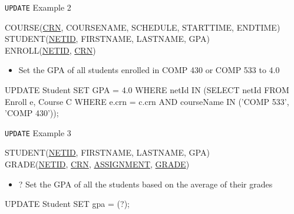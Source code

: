 \documentclass[aspectratio=169]{beamer}
\newenvironment{noindentitemize}
{ \begin{itemize}
 \setlength{\itemsep}{1.5ex}
  \setlength{\parsep}{0pt}   
  \setlength{\parskip}{0pt}
 \addtolength{\leftskip}{-2em}
 }
{ \end{itemize} }
\begin{document}
\begin{frame}[fragile]{\texttt{UPDATE} Example 2}

COURSE(\underline{CRN}, COURSENAME, SCHEDULE, STARTTIME, ENDTIME)\\
STUDENT(\underline{NETID}, FIRSTNAME, LASTNAME, GPA)\\
ENROLL(\underline{NETID}, \underline{CRN})\\
\vspace{2em}
\begin{noindentitemize}
\item Set the GPA of all students enrolled in COMP 430 or COMP 533 to 4.0
\end{noindentitemize}

\begin{SQL}
UPDATE Student 
	SET GPA = 4.0 
	WHERE netId IN 
		(SELECT netId 
		 FROM Enroll e, Course C 
		 WHERE e.crn = c.crn
			AND courseName IN ('COMP 533', 'COMP 430'));

\end{SQL}

\end{frame}

\begin{frame}[fragile]{\texttt{UPDATE} Example 3}

STUDENT(\underline{NETID}, FIRSTNAME, LASTNAME, GPA)\\
GRADE(\underline{NETID}, \underline{CRN}, \underline{ASSIGNMENT}, \underline{GRADE})\\
\vspace{2em}
\begin{noindentitemize}
\item[?] Set the GPA of all the students based on the average of their grades
\end{noindentitemize}

\begin{SQL}
UPDATE Student 
SET gpa = (?);
\end{SQL}

\end{frame}
\end{document}
